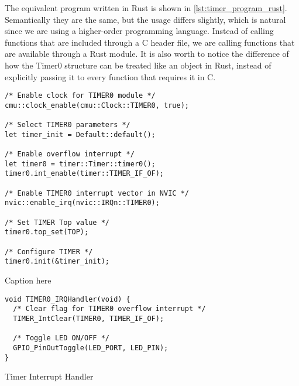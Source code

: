 The equivalent program written in Rust is shown in \autoref{lst:timer_program_rust}. Semantically
they are the same, but the usage differs slightly, which is natural since we are using a
higher-order programming language. Instead of calling functions that are included through a C header
file, we are calling functions that are available through a Rust module. It is also worth to notice
the difference of how the Timer0 structure can be treated like an object in Rust, instead of
explicitly passing it to every function that requires it in C.

\begin{listing}[tb]
\begin{verbatim}
/* Enable clock for TIMER0 module */
cmu::clock_enable(cmu::Clock::TIMER0, true);

/* Select TIMER0 parameters */
let timer_init = Default::default();

/* Enable overflow interrupt */
let timer0 = timer::Timer::timer0();
timer0.int_enable(timer::TIMER_IF_OF);

/* Enable TIMER0 interrupt vector in NVIC */
nvic::enable_irq(nvic::IRQn::TIMER0);

/* Set TIMER Top value */
timer0.top_set(TOP);

/* Configure TIMER */
timer0.init(&timer_init);
\end{verbatim}
\caption{Caption here}
\label{lst:timer_program_rust}
\end{listing}

\begin{listing}[tb]
\begin{verbatim}
void TIMER0_IRQHandler(void) {
  /* Clear flag for TIMER0 overflow interrupt */
  TIMER_IntClear(TIMER0, TIMER_IF_OF);

  /* Toggle LED ON/OFF */
  GPIO_PinOutToggle(LED_PORT, LED_PIN);
}
\end{verbatim}
\caption{Timer Interrupt Handler}
\label{lst:timer_interrupt_handler}
\end{listing}

